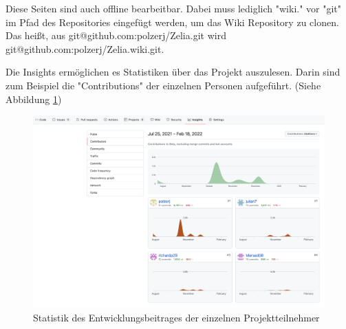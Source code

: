Diese Seiten sind auch offline bearbeitbar. Dabei muss lediglich "wiki." vor "git" im Pfad des Repositories eingefügt werden, um das Wiki Repository zu clonen. Das heißt, aus {\ttfamily git@github.com:polzerj/Zelia.git} wird {\ttfamily git@github.com:polzerj/Zelia.wiki.git}. 


Die Insights ermöglichen es Statistiken über das Projekt auszulesen. Darin sind zum Beispiel die "Contributions" der einzelnen Personen aufgeführt. (Siehe Abbildung \ref{fig:insights})

\begin{figure}[H]
    \centering
    \includegraphics[width=\textwidth]{media/ProjectManagement/Insights.png}
    \caption{Statistik des Entwicklungsbeitrages der einzelnen Projektteilnehmer}
    \label{fig:insights}
\end{figure}